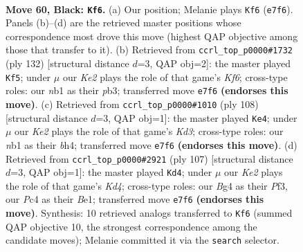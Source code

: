 \documentclass[11pt]{article}
\begin{document}
\clearpage

\begin{figure}[p]\centering
\begin{subfigure}{0.46\textwidth}\centering
\resizebox{\linewidth}{!}{%
\newchessgame
\chessboard[
  setfen={8/4k3/p6B/8/2p3b1/8/5K2/1N6 b - - 19 60},
  showmover=false,
  pgfstyle=straightmove, color=movearrow, markmove={e7-f6}
]}
\caption{}
\end{subfigure}\hfill
\begin{subfigure}{0.46\textwidth}\centering
\resizebox{\linewidth}{!}{%
\newchessgame
\chessboard[
  setfen={5B2/3k4/5K2/7b/8/1p2P3/1P6/8 w - - 9 67},
  showmover=false,
  pgfstyle=straightmove, color=movearrow, markmove={f6-f5}
]}
\caption{}
\end{subfigure}
\\[4pt]
\begin{subfigure}{0.46\textwidth}\centering
\resizebox{\linewidth}{!}{%
\newchessgame
\chessboard[
  setfen={8/6k1/8/8/5PPb/3K4/B7/8 w - - 1 55},
  showmover=false,
  pgfstyle=straightmove, color=movearrow, markmove={d3-e4}
]}
\caption{}
\end{subfigure}\hfill
\begin{subfigure}{0.46\textwidth}\centering
\resizebox{\linewidth}{!}{%
\newchessgame
\chessboard[
  setfen={8/8/8/3k3p/8/3B1p2/8/4b2K b - - 1 54},
  showmover=false,
  pgfstyle=straightmove, color=movearrow, markmove={d5-d4}
]}
\caption{}
\end{subfigure}
\caption{\textbf{Move 60, Black: \texttt{Kf6}.} (a) Our position; Melanie plays \texttt{Kf6} (\texttt{e7f6}). Panels (b)--(d) are the retrieved master positions whose correspondence most drove this move (highest QAP objective among those that transfer to it). (b) Retrieved from \texttt{ccrl\_top\_p0000\#1732} (ply 132) [structural distance $d$=3, QAP obj=2]: the master played \texttt{Kf5}; under $\mu$ our \emph{Ke2} plays the role of that game's \emph{Kf6}; cross-type roles: our \emph{n}b1 as their \emph{p}b3; transferred move \texttt{e7f6} \textbf{(endorses this move)}. (c) Retrieved from \texttt{ccrl\_top\_p0000\#1010} (ply 108) [structural distance $d$=3, QAP obj=1]: the master played \texttt{Ke4}; under $\mu$ our \emph{Ke2} plays the role of that game's \emph{Kd3}; cross-type roles: our \emph{n}b1 as their \emph{b}h4; transferred move \texttt{e7f6} \textbf{(endorses this move)}. (d) Retrieved from \texttt{ccrl\_top\_p0000\#2921} (ply 107) [structural distance $d$=3, QAP obj=1]: the master played \texttt{Kd4}; under $\mu$ our \emph{Ke2} plays the role of that game's \emph{Kd4}; cross-type roles: our \emph{B}g4 as their \emph{P}f3, our \emph{P}c4 as their \emph{B}e1; transferred move \texttt{e7f6} \textbf{(endorses this move)}. Synthesis: 10 retrieved analogs transferred to \texttt{Kf6} (summed QAP objective 10, the strongest correspondence among the candidate moves); Melanie committed it via the \texttt{search} selector.}
\label{fig:thought-m119}
\end{figure}
\end{document}

